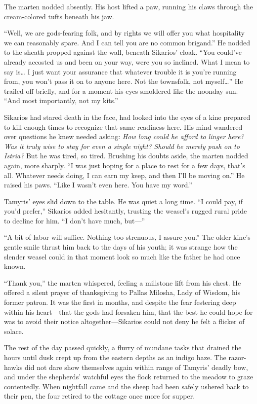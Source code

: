 The marten nodded absently. His host lifted a paw, running his claws through the cream-colored tufts beneath his jaw.

``Well, we are gods-fearing folk, and by rights we will offer you what hospitality we can reasonably spare. And I can tell you are no common brigand.'' He nodded to the sheath propped against the wall, beneath Sikarios' cloak. ``You could've already accosted us and been on your way, were you so inclined. What I mean to say is\ldots{} I just want your assurance that whatever trouble it is you're running from, you won't pass it on to anyone here. Not the townsfolk, not myself\ldots'' He trailed off briefly, and for a moment his eyes smoldered like the noonday sun. ``And most importantly, not my kits.''

Sikarios had stared death in the face, had looked into the eyes of a kine prepared to kill enough times to recognize that same readiness here. His mind wandered over questions he knew needed asking: \emph{How long could he afford to linger here? Was it truly wise to stay for even a single night?} \emph{Should he merely push on to Istria?} But he was tired, so tired. Brushing his doubts aside, the marten nodded again, more sharply. ``I was just hoping for a place to rest for a few days, that's all. Whatever needs doing, I can earn my keep, and then I'll be moving on.'' He raised his paws. ``Like I wasn't even here. You have my word.''

Tamyris' eyes slid down to the table. He was quiet a long time. ``I could pay, if you'd prefer,'' Sikarios added hesitantly, trusting the weasel's rugged rural pride to decline for him. ``I don't have much, but---''

``A bit of labor will suffice. Nothing too strenuous, I assure you.'' The older kine's gentle smile thrust him back to the days of his youth; it was strange how the slender weasel could in that moment look so much like the father he had once known.

``Thank you,'' the marten whispered, feeling a millstone lift from his chest. He offered a silent prayer of thanksgiving to Pallas Milosha, Lady of Wisdom, his former patron. It was the first in months, and despite the fear festering deep within his heart---that the gods had forsaken him, that the best he could hope for was to avoid their notice altogether---Sikarios could not deny he felt a flicker of solace.

\secdiv

\noindent The rest of the day passed quickly, a flurry of mundane tasks that drained the hours until dusk crept up from the eastern depths as an indigo haze. The razor-hawks did not dare show themselves again within range of Tamyris' deadly bow, and under the shepherds' watchful eyes the flock returned to the meadow to graze contentedly. When nightfall came and the sheep had been safely ushered back to their pen, the four retired to the cottage once more for supper.


